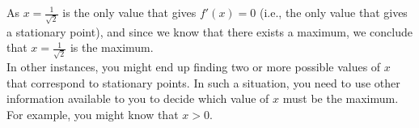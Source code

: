 As $x = \frac{1}{\sqrt{2}}$ is the only value that gives $f'(x) = 0$ (i.e., the only value that gives a stationary point), and since we know that there exists a maximum, we conclude that $x = \frac{1}{\sqrt{2}}$ is the maximum. \\

\noindent In other instances, you might end up finding two or more possible values of $x$ that correspond to stationary points. In such a situation, you need to use other information available to you to decide which value of $x$ must be the maximum. For example, you might know that $x > 0$.